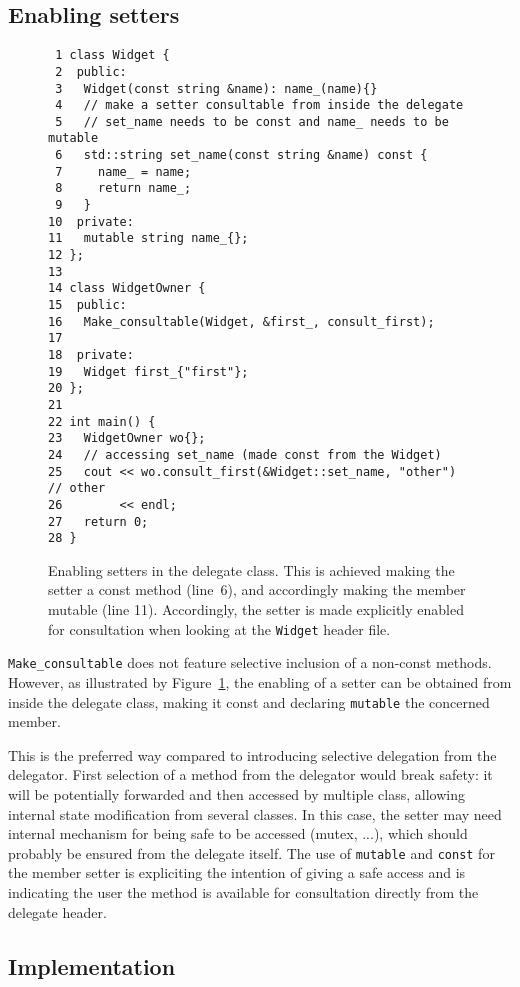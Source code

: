 \documentclass{article}
\begin{document}
\subsection{Enabling setters}

\begin{figure}[ht]
{\small
\begin{lstlisting}
 1 class Widget {
 2  public:
 3   Widget(const string &name): name_(name){}
 4   // make a setter consultable from inside the delegate 
 5   // set_name needs to be const and name_ needs to be mutable
 6   std::string set_name(const string &name) const {
 7     name_ = name;
 8     return name_;
 9   }
10  private:
11   mutable string name_{};
12 };
13 
14 class WidgetOwner {
15  public:
16   Make_consultable(Widget, &first_, consult_first);
17   
18  private:
19   Widget first_{"first"};
20 };
21 
22 int main() {
23   WidgetOwner wo{};
24   // accessing set_name (made const from the Widget)
25   cout << wo.consult_first(&Widget::set_name, "other")  // other
26        << endl;
27   return 0;
28 }
\end{lstlisting}}
\cprotect\caption{Enabling setters in the delegate class. This is achieved making the setter a const method (line~6), and accordingly making the member mutable (line 11). Accordingly, the setter is made explicitly enabled for consultation when looking at the \verb+Widget+ header file.}
\label{example:setters}
\end{figure}

\verb+Make_consultable+ does not feature selective inclusion of a non-const methods. However, as illustrated by Figure~\ref{example:setters}, the enabling of a setter can be obtained from inside the delegate class, making it const and declaring \verb+mutable+ the concerned member. 

This is the preferred way compared to introducing selective delegation from the delegator. First selection of a method from the delegator would break safety: it will be potentially forwarded and then accessed by multiple class, allowing internal state modification from several classes. In this case, the setter may need internal mechanism for being safe to be accessed (mutex, ...), which should probably be ensured from the delegate itself. The use of \verb+mutable+ and \verb+const+ for the member setter is expliciting the intention of giving a safe access and is indicating the user the method is available for consultation directly from the delegate header. 

\subsection{Implementation}
\label{implementation}
\end{document}
